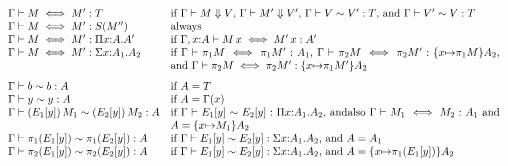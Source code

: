 \documentclass{article}
\theoremstyle{break}
\begin{document}
\[\begin{array}{lp{4.2truein}}
\aconequiv{\context}{\constructor}{\constructor'}{\ktype}&
  if
    $\headnormsto{\context}{\constructor}{\kind}{\cvalue}$,
    $\headnormsto{\context}{\constructor'}{\kind}{\cvalue'}$, 
    $\weakconequiv{\context}{\cvalue}{\cvalue'}{\ktype}$, and
    $\weakconequiv{\context}{\cvalue'}{\cvalue}{\ktype}$\\
\aconequiv{\context}{\constructor}{\constructor'}{\ksingleton{\constructor''}}&
  always\\
\aconequiv{\context}{\constructor}{\constructor'}
  {\kpi{\cvar}{\kind}{\kind'}}&
  if
  $\aconequiv{\context,\cvar{:}\kind}{\capply{\constructor}{\cvar}}
           {\capply{\constructor'}{\cvar}}{\kind'}$\\ %
\aconequiv{\context}{\constructor}{\constructor'}
  {\ksigma{\cvar}{\kind_1}{\kind_2}}&
  if
  $\aconequiv{\context}{\cpi{1}{\constructor}}
     {\cpi{1}{\constructor'}}{\kind_1}$, %
  $\aconequiv{\context}{\cpi{2}{\constructor}}
           {\cpi{2}{\constructor'}}
           {\substitute{\cvar}{\cpi{1}{\constructor}}\kind_2}$, and
  $\aconequiv{\context}{\cpi{2}{\constructor}}
           {\cpi{2}{\constructor'}}
           {\substitute{\cvar}{\cpi{1}{\constructor'}}\kind_2}$\\[7pt]

\weakconequiv{\context}{\basetype}{\basetype}{\kind}&
  if $\kind=\ktype$\\
\weakconequiv{\context}{\othercvar}{\othercvar}{\kind}&
  if $\kind=\context(\cvar)$\\
\weakconequiv{\context}{\capply{(E_1[\othercvar])}{\constructor_1}}
  {\capply{(E_2[\othercvar])}{\constructor_2}}{\kind}&
  if 
  $\weakconequiv{\context}{E_1[\othercvar]}{E_2[\othercvar]}
    {\kpi{\cvar}{\kind_1}{\kind_2}}$,
  andalso
  $\aconequiv{\context}{\constructor_1}{\constructor_2}{\kind_1}$ and
  $\kind = \substitute{\cvar}{\constructor_1}{\kind_2}$\\
\weakconequiv{\context}{\cpi{1}{(E_1[\othercvar])}}
  {\cpi{1}{(E_2[\othercvar])}}{\kind}&
  if $\weakconequiv{\context}{E_1[\othercvar]}{E_2[\othercvar]}
    {\ksigma{\cvar}{\kind_1}{\kind_2}}$,
  and
  $\kind = \kind_1$\\
\weakconequiv{\context}{\cpi{2}{(E_1[\othercvar])}}
  {\cpi{2}{(E_2[\othercvar])}}{\kind}&
  if $\weakconequiv{\context}{E_1[\othercvar]}{E_2[\othercvar]}
    {\ksigma{\cvar}{\kind_1}{\kind_2}}$,
  and
  $\kind = \substitute{\cvar}{\cpi{1}{(E_1[\othercvar])}}{\kind_2}$\\[7pt]


\end{array}\]
\end{document}
